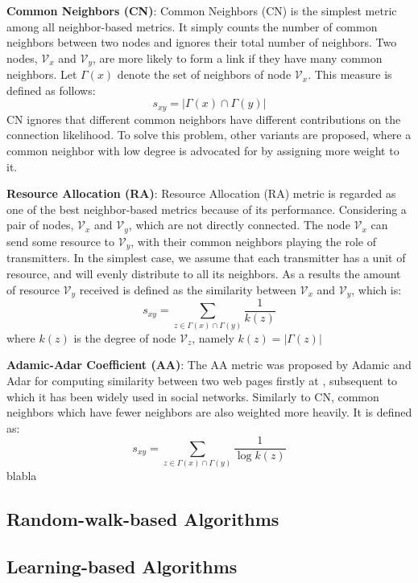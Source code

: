 \documentclass[\main/thesis.tex]{subfiles}
\begin{document}
\textbf{Common Neighbors (CN)}: Common Neighbors (CN) \cite{newman2001clustering} is the simplest metric among all neighbor-based metrics. It simply counts the number of common neighbors between two nodes and ignores their total number of neighbors. Two nodes, $\mathcal{V}_x$ and $\mathcal{V}_y$, are more likely to form a link if they have many common neighbors. Let $\Gamma(x)$ denote the set of neighbors of node $\mathcal{V}_x$. This measure is defined as follows:
\begin{equation}
s_{xy}=|\Gamma(x)\cap\Gamma(y)|
\end{equation}
CN ignores that different common neighbors have different contributions on the connection likelihood. To solve this problem, other variants are proposed, where a common neighbor with low degree is advocated for by assigning more weight to it. 

\textbf{Resource Allocation (RA)}: Resource Allocation (RA) \cite{zhou2009predicting} metric is regarded as one of the best neighbor-based metrics because of its performance. Considering a pair of nodes, $\mathcal{V}_x$ and $\mathcal{V}_y$, which are not directly connected. The node $\mathcal{V}_x$ can send some resource to $\mathcal{V}_y$, with their common neighbors playing the role of transmitters. In the simplest case, we assume that each transmitter has a unit of resource, and will evenly distribute to all its neighbors. As a results the amount of resource $\mathcal{V}_y$ received is defined as the similarity
between $\mathcal{V}_x$ and $\mathcal{V}_y$, which is:
\begin{equation}
s_{xy}=\sum_{z\in \Gamma(x)\cap\Gamma(y)}\frac{1}{k(z)}
\end{equation}
where $k(z)$ is the degree of node $\mathcal{V}_z$, namely $k(z) = |\Gamma(z)|$

\textbf{Adamic-Adar Coefficient (AA)}: The AA metric was proposed by Adamic and Adar for computing similarity between two web pages firstly at \cite{adamic2003friends}, subsequent to which it has been widely used in social networks. Similarly to CN, common neighbors which have fewer neighbors are also weighted more heavily. It is defined as:
\begin{equation}
s_{xy}=\sum_{z\in \Gamma(x)\cap\Gamma(y)}\frac{1}{\log{k(z)}}
\end{equation}
blabla
\subsection{Random-walk-based Algorithms}

\subsection{Learning-based Algorithms}
\end{document}
